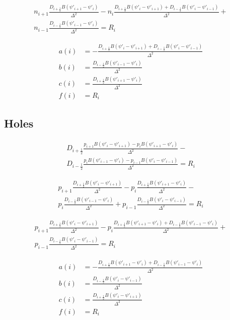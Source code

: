 \documentclass[12pt]{article}
\begin{document}
\begin{multline}
n_{i+1}
\frac
{D_{i+\frac{1}{2}}B(\psi'_{i+1}-\psi'_{i})}
{\Delta^{2}}-
n_{i}
\frac
{D_{i+\frac{1}{2}}B(\psi'_{i}-\psi'_{i+1})+
D_{i-\frac{1}{2}}B(\psi'_{i}-\psi'_{i-1})}
{\Delta^{2}}+
\\
n_{i-1}	
\frac
{D_{i-\frac{1}{2}}B(\psi'_{i-1}-\psi'_{i})}
{\Delta^{2}}=
R_{i}
\end{multline}

\begin{align}
a(i)&=-\frac
{D_{i+\frac{1}{2}}B(\psi'_{i}-\psi'_{i+1})+
	D_{i-\frac{1}{2}}B(\psi'_{i}-\psi'_{i-1})}
{\Delta^{2}}
\\
b(i)&=\frac{D_{i-\frac{1}{2}}B(\psi'_{i-1}-\psi'_{i})}
{\Delta^{2}}
\\
c(i)&=\frac
{D_{i+\frac{1}{2}}B(\psi'_{i+1}-\psi'_{i})}
{\Delta^{2}}
\\
f(i)&=R_{i}
\end{align}

\subsection{Holes}
\begin{multline}
D_{i+\frac{1}{2}}
\frac
{p_{i+1}B(\psi'_{i}-\psi'_{i+1})-p_{i}B(\psi'_{i+1}-\psi'_{i})}
{\Delta^{2}}-
\\
D_{i-\frac{1}{2}}
\frac
{p_{i}B(\psi'_{i-1}-\psi'_{i})-p_{i-1}B(\psi'_{i}-\psi'_{i-1})}
{\Delta^{2}}=
R_{i}
\end{multline}

\begin{multline}
p_{i+1}
\frac
{D_{i+\frac{1}{2}}B(\psi'_{i}-\psi'_{i+1})}
{\Delta^{2}}-
p_{i}
\frac{D_{i+\frac{1}{2}}B(\psi'_{i+1}-\psi'_{i})}
{\Delta^{2}}-
\\
p_{i}
\frac
{D_{i-\frac{1}{2}}B(\psi'_{i-1}-\psi'_{i})}
{\Delta^{2}}+
p_{i-1}	
\frac
{D_{i-\frac{1}{2}}B(\psi'_{i}-\psi'_{i-1})}
{\Delta^{2}}=
R_{i}
\end{multline}

\begin{multline}
p_{i+1}
\frac
{D_{i+\frac{1}{2}}B(\psi'_{i}-\psi'_{i+1})}
{\Delta^{2}}-
p_{i}
\frac
{D_{i+\frac{1}{2}}B(\psi'_{i+1}-\psi'_{i})+
D_{i-\frac{1}{2}}B(\psi'_{i-1}-\psi'_{i})}
{\Delta^{2}}+
\\
p_{i-1}	
\frac
{D_{i-\frac{1}{2}}B(\psi'_{i}-\psi'_{i-1})}
{\Delta^{2}}=
R_{i}
\end{multline}

\begin{align}
a(i)&=-\frac
{D_{i+\frac{1}{2}}B(\psi'_{i+1}-\psi'_{i})+
	D_{i-\frac{1}{2}}B(\psi'_{i-1}-\psi'_{i})}
{\Delta^{2}}
\\
b(i)&=\frac
{D_{i-\frac{1}{2}}B(\psi'_{i}-\psi'_{i-1})}
{\Delta^{2}}
\\
c(i)&=\frac
{D_{i+\frac{1}{2}}B(\psi'_{i}-\psi'_{i+1})}
{\Delta^{2}}
\\
f(i)&=R_{i}
\end{align}
\end{document}

